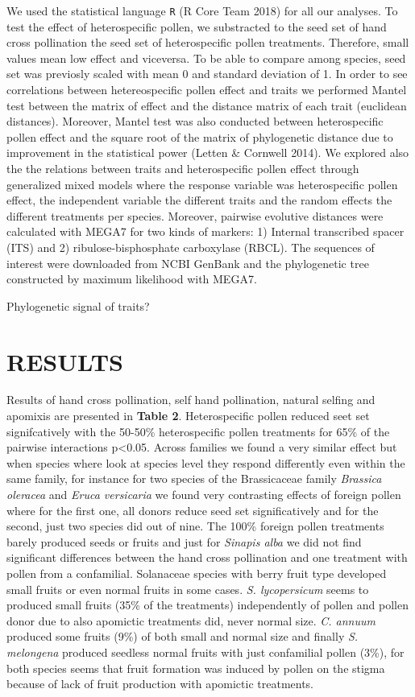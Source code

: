 \documentclass[11pt,a4paper]{article}
\begin{document}
We used the statistical language \texttt{R} (R Core Team 2018) for all
our analyses. To test the effect of heterospecific pollen, we
substracted to the seed set of hand cross pollination the seed set of
heterospecific pollen treatments. Therefore, small values mean low
effect and viceversa. To be able to compare among species, seed set was
previosly scaled with mean 0 and standard deviation of 1. In order to
see correlations between hetereospecific pollen effect and traits we
performed Mantel test between the matrix of effect and the distance
matrix of each trait (euclidean distances). Moreover, Mantel test was
also conducted between heterospecific pollen effect and the square root
of the matrix of phylogenetic distance due to improvement in the
statistical power (Letten \& Cornwell 2014). We explored also the the
relations between traits and heterospecific pollen effect through
generalized mixed models where the response variable was heterospecific
pollen effect, the independent variable the different traits and the
random effects the different treatments per species. Moreover, pairwise
evolutive distances were calculated with MEGA7 for two kinds of markers:
1) Internal transcribed spacer (ITS) and 2) ribulose-bisphosphate
carboxylase (RBCL). The sequences of interest were downloaded from NCBI
GenBank and the phylogenetic tree constructed by maximum likelihood with
MEGA7.

Phylogenetic signal of traits?

\newpage

\section{RESULTS}\label{results}

Results of hand cross pollination, self hand pollination, natural
selfing and apomixis are presented in \textbf{Table 2}. Heterospecific
pollen reduced seet set signifcatively with the 50-50\% heterospecific
pollen treatments for 65\% of the pairwise interactions
p\textless{}0.05. Across families we found a very similar effect but
when species where look at species level they respond differently even
within the same family, for instance for two species of the Brassicaceae
family \emph{Brassica oleracea} and \emph{Eruca versicaria} we found
very contrasting effects of foreign pollen where for the first one, all
donors reduce seed set significatively and for the second, just two
species did out of nine. The 100\% foreign pollen treatments barely
produced seeds or fruits and just for \emph{Sinapis alba} we did not
find significant differences between the hand cross pollination and one
treatment with pollen from a confamilial. Solanaceae species with berry
fruit type developed small fruits or even normal fruits in some cases.
\emph{S. lycopersicum} seems to produced small fruits (35\% of the
treatments) independently of pollen and pollen donor due to also
apomictic treatments did, never normal size. \emph{C. annuum} produced
some fruits (9\%) of both small and normal size and finally \emph{S.
melongena} produced seedless normal fruits with just confamilial pollen
(3\%), for both species seems that fruit formation was induced by pollen
on the stigma because of lack of fruit production with apomictic
treatments.
\end{document}
